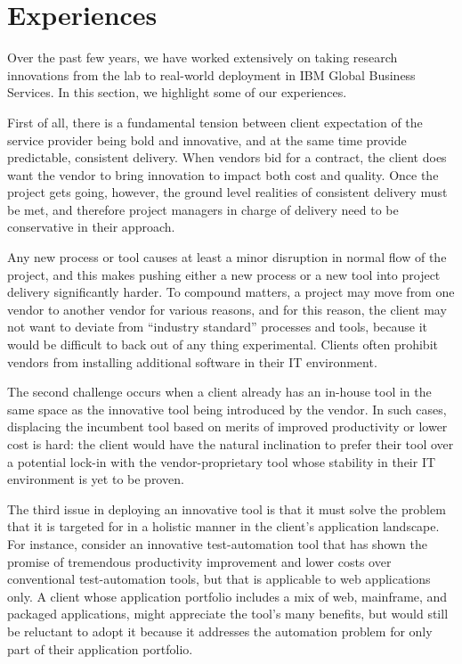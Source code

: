 \section{Experiences}
\label{sec:experience}
Over the past few years, we have worked extensively on taking research
innovations from the lab to real-world deployment in IBM Global Business
Services. In this section, we highlight some of our experiences.

First of all, there is a fundamental tension between client expectation of the
service provider being bold and innovative, and at the same time provide
predictable, consistent delivery.  When vendors bid for a contract, the client
does want the vendor to bring innovation to impact both cost and quality. Once
the project gets going, however, the ground level realities of consistent
delivery must be met, and therefore project managers in charge of delivery need
to be conservative in their approach.

Any new process or tool causes at least a minor disruption in normal flow of
the project, and this makes pushing either a new process or a new tool into
project delivery significantly harder.  To compound matters, a project may move
from one vendor to another vendor for various reasons, and for this reason, the
client may not want to deviate from ``industry standard'' processes and tools,
because it would be difficult to back out of any thing experimental. Clients
often prohibit vendors from installing additional software in their IT
environment.

The second challenge occurs when a client already has an in-house tool in the
same space as the innovative tool being introduced by the vendor. In such cases,
displacing the incumbent tool based on merits of improved productivity or lower
cost is hard: the client would have the natural inclination to prefer their tool
over a potential lock-in with the vendor-proprietary tool whose stability in
their IT environment is yet to be proven.

The third issue in deploying an innovative tool is that it must solve the
problem that it is targeted for in a holistic manner in the client's application
landscape. For instance, consider an innovative test-automation tool that has
shown the promise of tremendous productivity improvement and lower costs over
conventional test-automation tools, but that is applicable to web applications
only. A client whose application portfolio includes a mix of web, mainframe, and
packaged applications, might appreciate the tool's many benefits, but would
still be reluctant to adopt it because it addresses the automation problem for
only part of their application portfolio.


